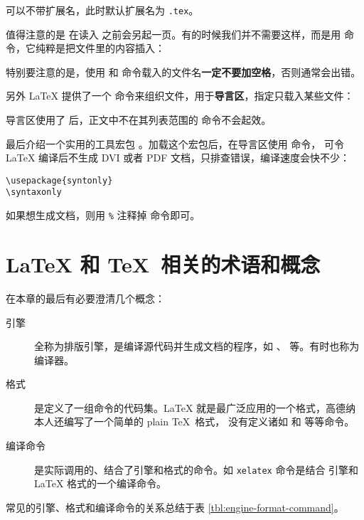  可以不带扩展名，此时默认扩展名为 \texttt{.tex}。

值得注意的是  在读入  之前会另起一页。有的时候我们并不需要这样，而是用
 命令，它纯粹是把文件里的内容插入：
\begin{command}
\end{command}

特别要注意的是，使用  和  命令载入的文件名\textbf{一定不要加空格}，否则通常会出错。

另外 \LaTeX{} 提供了一个  命令来组织文件，用于\textbf{导言区}，指定只载入某些文件：
\begin{command}
\end{command}

导言区使用了  后，正文中不在其列表范围的  命令不会起效。

最后介绍一个实用的工具宏包 。加载这个宏包后，在导言区使用  命令，
可令 \LaTeX{} 编译后不生成 DVI 或者 PDF 文档，只排查错误，编译速度会快不少：
\begin{verbatim}
\usepackage{syntonly}
\syntaxonly
\end{verbatim}

如果想生成文档，则用 \texttt\% 注释掉  命令即可。

\section{\LaTeX{} 和 \TeX\ 相关的术语和概念}\label{sec:concepts}

在本章的最后有必要澄清几个概念：
\begin{description}
  \item[引擎] 全称为排版引擎，是编译源代码并生成文档的程序，如 、 等。有时也称为编译器。
  \item[格式] 是定义了一组命令的代码集。\LaTeX{} 就是最广泛应用的一个格式，高德纳本人还编写了一个简单的 plain \TeX\ 格式，
  没有定义诸如  和  等等命令。
  \item[编译命令] 是实际调用的、结合了引擎和格式的命令。如 \texttt{xelatex} 命令是结合 
  引擎和 \LaTeX{} 格式的一个编译命令。
\end{description}
常见的引擎、格式和编译命令的关系总结于表 \ref{tbl:engine-format-command}。

